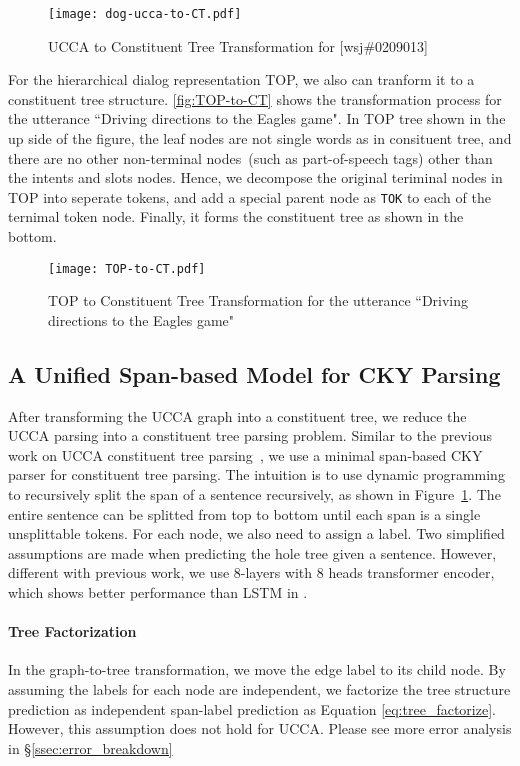 \begin{figure}[!h]
\centering
\texttt{[image: dog-ucca-to-CT.pdf]}
\caption{\label{fig:ucca-to-CT} UCCA to Constituent Tree Transformation for [wsj\#0209013]}
\end{figure}

 For the hierarchical dialog
representation TOP, we also can tranform it to a constituent tree
structure. \autoref{fig:TOP-to-CT} shows the transformation process
for the utterance ``Driving directions to the Eagles game". In TOP
tree shown in the up side of the figure, the leaf nodes are not single
words as in consituent tree, and there are no other non-terminal
nodes~(such as part-of-speech tags) other than the intents and slots
nodes. Hence, we decompose the original teriminal nodes in TOP into
seperate tokens, and add a special parent node as \texttt{TOK} to each
of the ternimal token node. Finally, it forms the constituent tree as
shown in the bottom.
\begin{figure}[!h]
\centering
\texttt{[image: TOP-to-CT.pdf]}
\caption{\label{fig:TOP-to-CT} TOP to Constituent Tree Transformation
  for the utterance ``Driving directions to the Eagles game"}
\end{figure}

\subsection{A Unified Span-based Model for CKY Parsing}
\label{ssec:phr:cky}
After transforming the UCCA graph into a constituent tree, we reduce
the UCCA parsing into a constituent tree parsing problem. Similar to
the previous work on UCCA constituent tree
parsing~\cite{jiang2019hlt}, we use a minimal span-based CKY parser
for constituent tree parsing.  The intuition is to use dynamic
programming to recursively split the span of a sentence recursively,
as shown in Figure~\ref{fig:ucca-to-CT}. The entire sentence can be
splitted from top to bottom until each span is a single unsplittable
tokens. For each node, we also need to assign a label. Two simplified
assumptions are made when predicting the hole tree given a
sentence. However, different with previous work, we use 8-layers with
8 heads transformer encoder, which shows better performance than LSTM
in \citet{kitaev2018constituency}.

\paragraph{Tree Factorization} In the graph-to-tree transformation, we
move the edge label to its child node. By assuming the labels for each
node are independent, we factorize the tree structure prediction as
independent span-label prediction as Equation
\ref{eq:tree_factorize}. However, this assumption does not hold for UCCA.
Please see more error analysis in \S \ref{ssec:error_breakdown}

